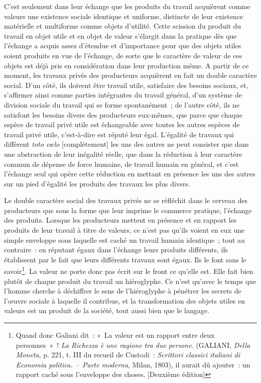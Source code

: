 \documentclass[french,twoside]{book} %
\begin{document}
C’est seulement dans leur échange que les produits du travail acquièrent comme valeurs une existence sociale identique et uniforme, distincte de leur existence matérielle et multiforme comme objets d’utilité. Cette scission du produit du travail en objet utile et en objet de valeur s’élargit dans la pratique dès que l’échange a acquis assez d’étendue et d’importance pour que des objets utiles soient produits en vue de l’échange, de sorte que le caractère de valeur de ces objets est déjà pris en considération dans leur production même. A partir de ce moment, les travaux privés des producteurs acquièrent en fait un double caractère social. D’un côté, ils doivent être travail utile, satisfaire des besoins sociaux, et, s’affirmer ainsi comme parties intégrantes du travail général, d’un système de division sociale du travail qui se forme spontanément ; de l’autre côté, ils ne satisfont les besoins divers des producteurs eux-mêmes, que parce que chaque espèce de travail privé utile est échangeable avec toutes les autres espèces de travail privé utile, c’est-à-dire est réputé leur égal. L’égalité de travaux qui diffèrent \emph{toto cœlo} [complètement] les uns des autres ne peut consister que dans une abstraction de leur inégalité réelle, que dans la réduction à leur caractère commun de dépense de force humaine, de travail humain en général, et c’est l’échange seul qui opère cette réduction en mettant en présence les uns des autres sur un pied d’égalité les produits des travaux les plus divers.\par
Le double caractère social des travaux privés ne se réfléchit dans le cerveau des producteurs que sous la forme que leur imprime le commerce pratique, l’échange des produits. Lorsque les producteurs mettent en présence et en rapport les produits de leur travail à titre de valeurs, ce n’est pas qu’ils voient en eux une simple enveloppe sous laquelle est caché un travail humain identique ; tout au contraire : en réputant égaux dans l’échange leurs produits différents, ils établissent par le fait que leurs différents travaux sont égaux. Ils le font sans le savoir\footnote{Quand donc Galiani dit : « La valeur est un rapport entre deux personnes » ! \emph{La Richezza è une ragione tra due persone}. (GALIANI, \emph{Della Moneta}, p. 221, t. III du recueil de Custodi : \emph{Scrittori classici italiani di Economia politica. – Parte moderna}, Milan, 1803), il aurait dû ajouter : un rapport caché sous l’enveloppe des choses. [Deuxième édition]}. La valeur ne porte donc pas écrit sur le front ce qu’elle est. Elle fait bien plutôt de chaque produit du travail un hiéroglyphe. Ce n’est qu’avec le temps que l’homme cherche à déchiffrer le sens de l’hiéroglyphe à pénétrer les secrets de l’œuvre sociale à laquelle il contribue, et la transformation des objets utiles en valeurs est un produit de la société, tout aussi bien que le langage.\par
\end{document}

